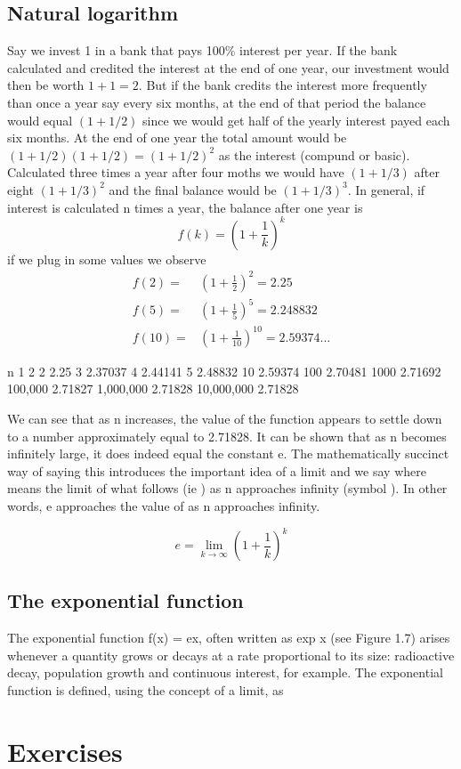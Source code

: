 \subsection{Natural logarithm}
Say we invest 1 in a bank that pays 100\% interest per year. If the bank calculated and credited the interest at the end of one year, our investment would then be worth $1 + 1 = 2$. But if the bank credits the interest more frequently than once a year say every six months, at the end of that period the balance would equal $(1 + 1/2)$ since we would get half of the yearly interest payed each six months. At the end of one year the total amount would be $(1 + 1/2)(1 + 1/2) = (1 + 1/2)^2$ as the interest (compund or basic). Calculated three times a year after four moths we would have $(1 + 1/3)$ after eight $(1 + 1/3)^2$ and the final balance would be $(1 + 1/3)^3$. In general, if interest is calculated n times a year, the balance after one year is
\[
f(k) = \left(1 + \frac{1}{k}\right)^k
\]
if we plug in some values we observe
\[
\begin{align*}
  f(2)  =& \left(1 + \frac{1}{2}\right)^2 = 2.25 \\
  f(5)  =& \left(1 + \frac{1}{5}\right)^5 = 2.248832 \\
  f(10) =& \left(1 + \frac{1}{10}\right)^{10} = 2.59374...
\end{align*}
\]

n 
1 2 
2 2.25 
3 2.37037 
4 2.44141 
5 2.48832 
10 2.59374 
100 2.70481 
1000 2.71692 
100,000 2.71827 
1,000,000 2.71828 
10,000,000 2.71828

We can see that as n increases, the value of the function appears to settle down to a number approximately equal to 2.71828. It can be shown that as n becomes infinitely large, it does indeed equal the constant e. The mathematically succinct way of saying this introduces the important idea of a limit and we say where means the limit of what follows (ie ) as n approaches infinity (symbol ). In other words, e approaches the value of as n approaches infinity.

\begin{equation}
e = \lim_{k\to\infty}\left(1 + \frac{1}{k}\right)^k
\end{equation}

\subsection{The exponential function}
The exponential function f(x) = ex, often written as exp x (see Figure 1.7) arises whenever a quantity grows or decays at a rate proportional to its size: radioactive decay, population growth and continuous interest, for example. The exponential function is defined, using the concept of a limit, as

\section{Exercises}
\begin{ExerciseList}
\end{ExerciseList}
